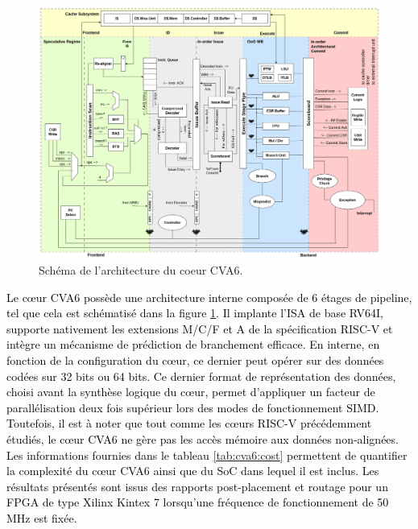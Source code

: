\documentclass[../main.tex]{subfiles}
\begin{document}
\begin{figure}
    \centering
    \includegraphics[scale=0.3]{chapter4/ariane_overview.drawio.png}
    \caption{Schéma de l'architecture du coeur CVA6.}
    \label{figure:cva6}
\end{figure}
\textcolor{black}{Le cœur CVA6 possède une architecture interne composée de 6 étages de pipeline, tel que cela est schématisé dans la figure \ref{figure:cva6}.
Il implante l'ISA de base RV64I, supporte nativement les extensions M/C/F et A de la spécification RISC-V et intègre un mécanisme de prédiction de branchement efficace. En interne, en fonction de la configuration du cœur, ce dernier peut opérer sur des données codées sur 32 bits ou 64 bits.
Ce dernier format de représentation des données, choisi avant la synthèse logique du cœur, permet d'appliquer un facteur de parallélisation deux fois supérieur lors des modes de fonctionnement SIMD. Toutefois, il est à noter que tout comme les cœurs RISC-V précédemment étudiés, le cœur CVA6 ne gère pas les accès mémoire aux données non-alignées. Les informations fournies dans le tableau \ref{tab:cva6:cost} permettent de quantifier la complexité du cœur CVA6 ainsi que du SoC dans lequel il est inclus. Les résultats présentés sont issus des rapports post-placement et routage pour un FPGA de type Xilinx Kintex 7 lorsqu'une fréquence de fonctionnement de 50 MHz est fixée.}
\end{document}
